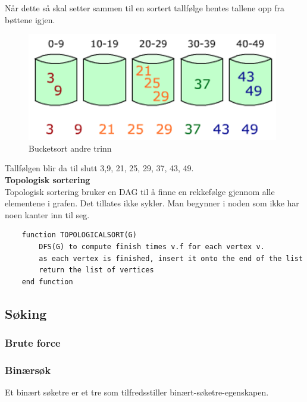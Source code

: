 \noindent Når dette så skal setter sammen til en sortert tallfølge hentes tallene opp fra bøttene igjen.

\begin{figure}[H]
\includegraphics[scale=0.5]{images/bucketsort2}
\centering %
\caption{Bucketsort andre trinn}
\label{fig:bucketsort2}
\end{figure}

\noindent Tallfølgen blir da til slutt 3,9, 21, 25, 29, 37, 43, 49.\\

\noindent \textbf{Topologisk sortering}\\
Topologisk sortering bruker en DAG til å finne en rekkefølge gjennom alle elementene i grafen. Det tillates ikke sykler. Man begynner i noden som ikke har noen kanter inn til seg.

\begin{lstlisting}
    function TOPOLOGICALSORT(G)
    	DFS(G) to compute finish times v.f for each vertex v.
    	as each vertex is finished, insert it onto the end of the list
    	return the list of vertices
    end function

\end{lstlisting}


\subsection{Søking}

\subsubsection{Brute force}

\subsubsection{Binærsøk}
Et binært søketre er et tre som tilfredsstiller binært-søketre-egenskapen.

